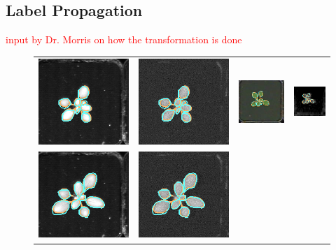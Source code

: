 \subsection{Label Propagation}
\textcolor{red}{input by Dr. Morris on how the transformation is done}

\begin{figure}
\begin{centering}
\begin{tabular}{cccc}
\includegraphics[width=.18\textwidth]{Figures/LabelAlignment/day_3_hour_23-seg_ir.png}&
\includegraphics[width=.18\textwidth]{Figures/LabelAlignment/day_3_hour_23-seg_fmp.png}&
\includegraphics[width=.18\textwidth]{Figures/LabelAlignment/day_3_hour_23-seg_rgb.png}&
\includegraphics[width=.18\textwidth]{Figures/LabelAlignment/day_3_hour_23-seg_depth.png}\\
\includegraphics[width=.18\textwidth]{Figures/LabelAlignment/day_5_hour_23-seg_ir.png}&
\includegraphics[width=.18\textwidth]{Figures/LabelAlignment/day_5_hour_23-seg_fmp.png}&

\end{tabular}
\end{centering}
\end{figure}
